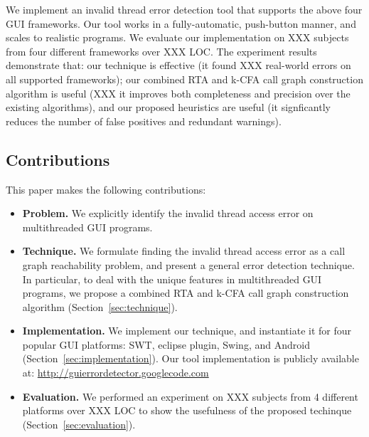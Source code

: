 

We implement an invalid thread error detection tool that supports
the above four GUI frameworks. Our tool works in a fully-automatic,
push-button manner, and scales to realistic programs.
We evaluate our implementation on XXX subjects from four different
frameworks over XXX LOC. The experiment results demonstrate
that: our technique is effective (it found XXX real-world errors
on all supported frameworks); our combined RTA and k-CFA call
graph construction algorithm is useful (XXX it improves both completeness
and precision over the existing algorithms), and our proposed
heuristics are useful (it signficantly reduces the number of
false positives and redundant warnings).




\subsection{Contributions}

This paper makes the following contributions:

\begin{itemize}
\item \textbf{Problem.} We explicitly identify the invalid thread
access error on multithreaded GUI programs.

\item \textbf{Technique.} We formulate finding
the invalid thread access error as a call graph reachability problem,
and present a general error detection technique.
In particular, to deal with the unique features in
multithreaded GUI programs, we propose a combined RTA and k-CFA
call graph construction algorithm (Section~\ref{sec:technique}).

\item \textbf{Implementation.} We implement our technique, and
instantiate it for four
popular GUI platforms: SWT, eclipse plugin, Swing, and Android (Section~\ref{sec:implementation}). Our
tool implementation is publicly available at:
\url{http://guierrordetector.googlecode.com}

\item \textbf{Evaluation.} We performed an experiment on XXX subjects
from 4 different platforms over XXX LOC to show the usefulness
of the proposed techinque (Section~\ref{sec:evaluation}).

\end{itemize}

